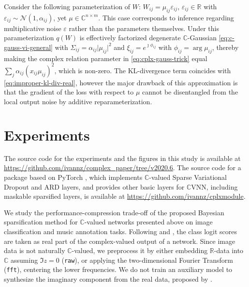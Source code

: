 \documentclass[a4paper,10pt,twocolumn]{article}
\newcommand{\real}{\mathbb{R}}
\newcommand{\cplx}{\mathbb{C}}
\newcommand{\iu}{{\jmath}}
\begin{document}
Consider the following parameterization of $W$: $
  W_{ij} = \mu_{ij} \varepsilon_{ij}
$, $\varepsilon_{ij} \in \real$ with $
  \varepsilon_{ij} \sim \mathcal{N}(1, \alpha_{ij})
$, yet $\mu \in \cplx^{n \times m}$. This case corresponds to inference regarding
multiplicative noise $\varepsilon$ rather than the parameters themselves. Under
this parameterization $q(W)$ is effectively factorized degenerate $\cplx$-Gaussian
\eqref{eq:c-gauss-vi-general} with $
  \Sigma_{ij} = \alpha_{ij} \lvert \mu_{ij} \rvert^2
$ and $
  \xi_{ij} = e^{\iu \phi_{ij}}
$ with $\phi_{ij} = \arg \mu_{ij}$, thereby making the complex relation parameter
in \eqref{eq:cplx-gauss-trick} equal $
  \sum_j \alpha_{ij} (x_{ij} \mu_{ij})^2
$, which is non-zero.
%
The KL-divergence term coincides with \eqref{eq:improper-kl-div-real}, however the major
drawback of this approximation is that the gradient of the loss with respect to $\mu$ cannot
be disentangled from the local output noise by additive reparameterization.





\section{Experiments} %
\label{sec:experiments}

The source code for the experiments and the figures in this study is available at
\url{https://github.com/ivannz/complex_paper/tree/v2020.6}.
%
The source code for a package based on PyTorch \citep{paszke_pytorch_2019}, which
implements $\cplx$-valued Sparse Variational Dropout and ARD layers, and provides
other basic layers for $\cplx$VNN, including maskable sparsified layers, is available at
\url{https://github.com/ivannz/cplxmodule}.
\smallskip

We study the performance-compression trade-off of the proposed Bayesian sparsification
method for $\cplx$-valued networks presented above on image classification and music
annotation tasks.
%
Following \citet{wolter_complex_2018} and \citet{trabelsi_deep_2018}, the class logit
scores are taken as real part of the complex-valued output of a network.
%
Since image data is not naturally $\cplx$-valued, we preprocess it by either embedding
$\real$-data into $\cplx$ assuming $\Im z = 0$ (\texttt{raw}), or applying the two-dimensional
Fourier Transform (\texttt{fft}), centering the lower frequencies. We do not train an
auxiliary model to synthesize the imaginary component from the real data, proposed by
\citet{trabelsi_deep_2018}.
\end{document}
